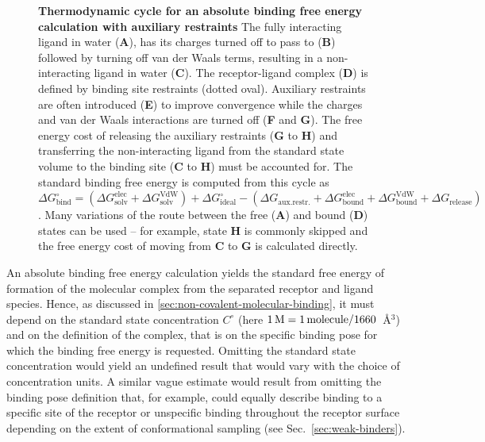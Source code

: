 \documentclass[9pt,bestpractices]{livecoms}
\begin{document}
\begin{figure}
    \caption{\textbf{Thermodynamic cycle for an absolute binding free energy calculation with auxiliary restraints} The fully interacting ligand in water (\textbf{A}), has its charges turned off to pass to (\textbf{B}) followed by turning off van der Waals terms, resulting in a non-interacting ligand in water (\textbf{C}). The receptor-ligand complex (\textbf{D}) is defined by binding site restraints (dotted oval). Auxiliary restraints are often introduced (\textbf{E}) to improve convergence while the charges and van der Waals interactions are turned off (\textbf{F} and \textbf{G}). The free energy cost of releasing the auxiliary restraints (\textbf{G} to \textbf{H}) and transferring the non-interacting ligand from the standard state volume to the binding site (\textbf{C} to \textbf{H}) must be accounted for. The standard binding free energy is computed from this cycle as $\Delta G^{\circ}_{\mathrm{bind}} = (\Delta G^{\mathrm{elec}}_{\mathrm{solv}}+ \Delta G^{\mathrm{VdW}}_{\mathrm{solv}}) + \Delta G^{\circ}_{\mathrm{ideal}} -(\Delta G_{\mathrm{aux.restr.}}+\Delta G^{\mathrm{elec}}_{\mathrm{bound}}+ \Delta G^{\mathrm{VdW}}_{\mathrm{bound}}+\Delta G_{\mathrm{release}})$. Many variations of the route between the free (\textbf{A}) and bound (\textbf{D}) states can be used -- for example, state \textbf{H} is commonly skipped and the free energy cost of moving from \textbf{C} to \textbf{G} is calculated directly.}
    \label{fig:fig_absolute_thermodynamic_cycle}
\end{figure}


An absolute binding free energy calculation yields the standard free energy of formation of the molecular complex from the separated receptor and ligand species. Hence, as discussed in \ref{sec:non-covalent-molecular-binding}, it must depend on the standard state concentration $C^\circ$ (here $1 \, {\rm M} = 1 \, {\rm molecule}/1660$~\r{A}$^3$) and on the definition of the complex, that is on the specific binding pose for which the binding free energy is requested. Omitting the standard state concentration would yield an undefined result that would vary with the choice of concentration units. A similar vague estimate would result from omitting the binding pose definition that, for example, could equally describe binding to a specific site of the receptor or unspecific binding throughout the receptor surface depending on the extent of conformational sampling (see Sec.~\ref{sec:weak-binders}).
\end{document}
